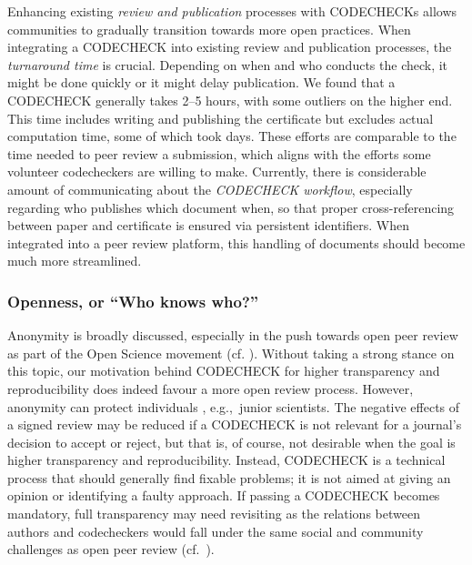 \documentclass[12pt]{article}
\newcommand{\rev}[1]{\textit{#1}}
\begin{document}
Enhancing existing \rev{review and publication} processes with CODECHECKs allows communities to
gradually transition towards more open practices.
When integrating a CODECHECK into existing review and publication processes, the \emph{turnaround time} is crucial.
Depending on when and who conducts the check, it might be done quickly
or it might delay publication.
We found that a CODECHECK generally takes  2--5 hours, with some outliers on the higher end.
This time includes writing and publishing the certificate but excludes
actual computation time, some of which took days.
These efforts are comparable to the time needed to peer review a submission,
which aligns with the efforts some volunteer codecheckers are willing to
make.
Currently, there is considerable amount of communicating about the \rev{CODECHECK workflow}, especially regarding who publishes which document when, so that proper
cross-referencing between paper and certificate is ensured via persistent
identifiers.  When integrated into a peer review platform, this
handling of documents should become much more streamlined.

\subsubsection*{Openness, or ``Who knows who?''}\label{who-knows-who}

Anonymity is broadly discussed, especially in the push towards
open peer review as part of the Open Science movement 
(cf. \cite{ross-hellauer_guidelines_2019}).
Without taking a strong stance on this topic, our motivation 
behind CODECHECK
for higher transparency and reproducibility does indeed favour a more open 
review process.
However, anonymity can protect individuals
\cite{tennant_limitations_2020}, e.g.,~junior scientists.  
The negative effects of a signed review may be reduced if a CODECHECK is not relevant for a journal's decision to accept or reject, but that is, of course, not desirable when the goal is higher transparency and reproducibility.
Instead, CODECHECK is a technical process that should generally find fixable problems; it is not aimed at giving an opinion or identifying a faulty approach.
If passing a CODECHECK becomes mandatory, full transparency may need
revisiting as the relations between authors and codecheckers would fall under the
same social and community challenges as open peer review
(cf.~\cite{everythinghertz123}).
\end{document}
